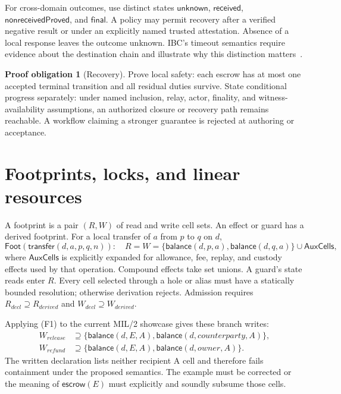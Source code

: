 \documentclass[11pt,a4paper]{article}
\newcommand{\foot}{\mathsf{Foot}}
\theoremstyle{definition}
\newtheorem{obligation}{Proof obligation}
\begin{document}
For cross-domain outcomes, use distinct states $\mathsf{unknown}$, $\mathsf{received}$, $\mathsf{nonreceivedProved}$, and $\mathsf{final}$. A policy may permit recovery after a verified negative result or under an explicitly named trusted attestation. Absence of a local response leaves the outcome unknown. IBC's timeout semantics require evidence about the destination chain and illustrate why this distinction matters~\cite{IBC}.

\begin{obligation}[Recovery]
Prove local safety: each escrow has at most one accepted terminal transition and all residual duties survive. State conditional progress separately: under named inclusion, relay, actor, finality, and witness-availability assumptions, an authorized closure or recovery path remains reachable. A workflow claiming a stronger guarantee is rejected at authoring or acceptance.
\end{obligation}

\section{Footprints, locks, and linear resources}
A footprint is a pair $(R,W)$ of read and write cell sets. An effect or guard has a derived footprint. For a local transfer of $a$ from $p$ to $q$ on $d$,
\[
\foot(\mathsf{transfer}(d,a,p,q,n)):
\quad R=W=\{\mathsf{balance}(d,p,a),\mathsf{balance}(d,q,a)\}
\cup\mathsf{AuxCells},
\tag{F1}
\]
where $\mathsf{AuxCells}$ is explicitly expanded for allowance, fee, replay, and custody effects used by that operation. Compound effects take set unions. A guard's state reads enter $R$. Every cell selected through a hole or alias must have a statically bounded resolution; otherwise derivation rejects. Admission requires $R_{decl}\supseteq R_{derived}$ and $W_{decl}\supseteq W_{derived}$.

Applying (F1) to the current MIL/2 showcase gives these branch writes:
\[
\begin{aligned}
W_{release}&\supseteq\{\mathsf{balance}(d,E,A),
\mathsf{balance}(d,counterparty,A)\},\\
W_{refund}&\supseteq\{\mathsf{balance}(d,E,A),
\mathsf{balance}(d,owner,A)\}.
\end{aligned}
\]
The written declaration lists neither recipient A cell and therefore fails containment under the proposed semantics. The example must be corrected or the meaning of $\mathsf{escrow}(E)$ must explicitly and soundly subsume those cells.
\end{document}
